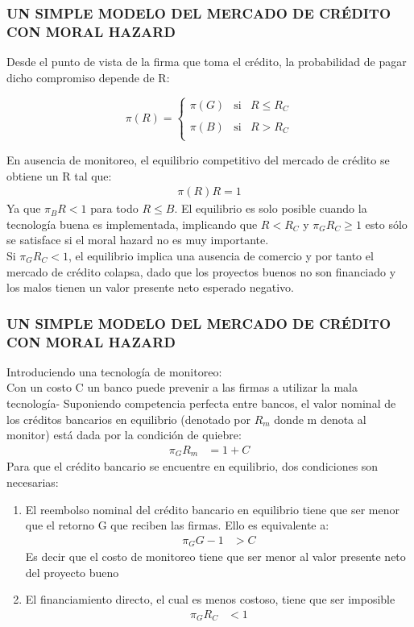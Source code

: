 \documentclass[10pt, xcolor=table, x11names]{beamer}
\begin{document}
\begin{frame}
    \frametitle{{\normalsize UN SIMPLE MODELO DEL MERCADO DE CRÉDITO CON MORAL HAZARD} {}}
 Desde el punto de vista de la firma que toma el crédito, la probabilidad de pagar dicho compromiso depende de R:
 
 \[\pi(R)=\left\{ \begin{array}{rcl}
 \pi(G) & \mbox{si} & R\leq R_{C}\\
 & & \\
 \pi(B) & \mbox{si} & R > R_{C}\\
 \end{array}
 \right. \] 

En ausencia de monitoreo, el equilibrio competitivo del mercado de crédito se obtiene un R tal que:
  \begin{align}
  \pi(R)R=1
  \end{align}    
Ya que $\pi_{B}R<1$ para todo $R\leq B$. El equilibrio es solo posible cuando la tecnología buena es implementada, implicando que  $R<R_{C}$ y $\pi_{G}R_{C}\geq 1$ esto sólo se satisface si el moral hazard no es muy importante.\\
Si  $\pi_{G}R_{C}<1$, el equilibrio implica una ausencia de comercio y por tanto el mercado de crédito colapsa, dado que los proyectos buenos no son financiado y los malos tienen un valor presente neto esperado negativo.

\end{frame}

\begin{frame}
    \frametitle{{\normalsize UN SIMPLE MODELO DEL MERCADO DE CRÉDITO CON MORAL HAZARD} {}}
   Introduciendo una tecnología de monitoreo:\\
   Con un costo C un banco puede prevenir a las firmas a utilizar la mala tecnología- Suponiendo competencia perfecta entre bancos, el valor nominal de los créditos bancarios en equilibrio (denotado por $R_{m}$ donde m denota al monitor) está dada por la condición de quiebre:
   \begin{align}
   \pi_{G}R_{m}&=1+C
   \end{align}   
    Para que el crédito bancario se encuentre en equilibrio, dos condiciones son necesarias:
    \begin{enumerate}
        \item El reembolso nominal del crédito bancario en equilibrio tiene que ser menor que el retorno G que reciben las firmas. Ello es equivalente a:
        \begin{align}
        \pi_{G}G-1&>C
        \end{align} 
        Es decir que el costo de monitoreo tiene que ser menor al valor presente neto del proyecto bueno 
        \item El financiamiento directo, el cual es menos costoso, tiene que ser imposible
        \begin{align}
        \pi_{G}R_{C}&<1
        \end{align} 
    \end{enumerate}
  
\end{frame}
\end{document}
